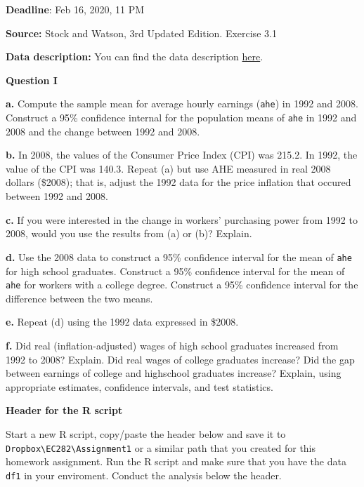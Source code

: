 \documentclass[
]{book}
\begin{document}
\textbf{Deadline}: Feb 16, 2020, 11 PM

\textbf{Source:} Stock and Watson, 3rd Updated Edition. Exercise 3.1

\textbf{Data description:} You can find the data description \href{https://wps.pearsoned.com/wps/media/objects/11422/11696965/empirical/empex_tb/CPS92_08_Description.pdf}{here}.

\textbf{Question I}

\textbf{a.} Compute the sample mean for average hourly earnings (\texttt{ahe}) in 1992 and 2008. Construct a 95\% confidence internal for the population means of \texttt{ahe} in 1992 and 2008 and the change between 1992 and 2008.

\textbf{b.} In 2008, the values of the Consumer Price Index (CPI) was 215.2. In 1992, the value of the CPI was 140.3. Repeat (a) but use AHE measured in real 2008 dollars (\$2008); that is, adjust the 1992 data for the price inflation that occured between 1992 and 2008.

\textbf{c.} If you were interested in the change in workers' purchasing power from 1992 to 2008, would you use the results from (a) or (b)? Explain.

\textbf{d.} Use the 2008 data to construct a 95\% confidence interval for the mean of \texttt{ahe} for high school graduates. Construct a 95\% confidence interval for the mean of \texttt{ahe} for workers with a college degree. Construct a 95\% confidence interval for the difference between the two means.

\textbf{e.} Repeat (d) using the 1992 data expressed in \$2008.

\textbf{f.} Did real (inflation-adjusted) wages of high school graduates increased from 1992 to 2008? Explain. Did real wages of college graduates increase? Did the gap between earnings of college and highschool graduates increase? Explain, using appropriate estimates, confidence intervals, and test statistics.

\textbf{Header for the R script}

Start a new R script, copy/paste the header below and save it to \texttt{Dropbox\textbackslash{}EC282\textbackslash{}Assignment1} or a similar path that you created for this homework assignment. Run the R script and make sure that you have the data \texttt{df1} in your enviroment. Conduct the analysis below the header.
\end{document}

